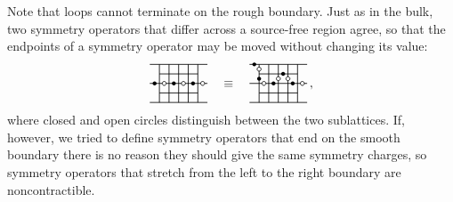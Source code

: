 %
%
Note that loops cannot terminate on the rough boundary. Just as in the bulk, two symmetry operators that differ across a source-free region agree, so that the endpoints of a symmetry operator may be moved without changing its value:
%
%
\begin{equation*}
    \begin{tikzpicture}[baseline={(0,-0.1)}, scale=0.75]%
        \foreach \y in {-2, 0, 2} {
            \draw [semithick] (-7.2ex, {\y*2.4 ex}) to (7.2ex, {\y*2.4 ex});
        }
        \foreach \y in {-1, 1} {
            \draw [semithick] (-4.8ex, {\y*2.4 ex}) to (4.8ex, {\y*2.4 ex});
        }
        \foreach \x in {-2, -1, ..., 2} {
            \draw [semithick] ({\x*2.4 ex}, {-2*2.4 ex}) to ({\x*2.4 ex}, {2*2.4 ex});
        }
        \fill (-6ex, 0) circle(0.5ex);\fill (-1.2ex, 0) circle(0.5ex);\fill (3.6ex, 0) circle(0.5ex);
        \draw [semithick, fill=white] (-3.6ex, 0) circle(0.5ex);\draw [semithick, fill=white] (1.2ex, 0) circle(0.5ex);\draw [semithick, fill=white] (6ex, 0) circle(0.5ex);
    \end{tikzpicture}
    \quad \equiv \quad
    \begin{tikzpicture}[baseline={(0,-0.1)}, scale=0.75]%
        \foreach \y in {-2, 0, 2} {
            \draw [semithick] (-7.2ex, {\y*2.4 ex}) to (7.2ex, {\y*2.4 ex});
        }
        \foreach \y in {-1, 1} {
            \draw [semithick] (-4.8ex, {\y*2.4 ex}) to (4.8ex, {\y*2.4 ex});
        }
        \foreach \x in {-2, -1, ..., 2} {
            \draw [semithick] ({\x*2.4 ex}, {-2*2.4 ex}) to ({\x*2.4 ex}, {2*2.4 ex});
        }
        \fill (-6ex, 4.8ex) circle(0.5ex);\fill (-4.8ex, 1.2ex) circle(0.5ex);
        \fill (-1.2ex, 0) circle(0.5ex);\fill (3.6ex, 0) circle(0.5ex);
        \fill (1.2ex, 2.4ex) circle(0.5ex);
        \draw [semithick, fill=white] (-4.8ex, 3.6ex) circle(0.5ex);\draw [semithick, fill=white] (-3.6ex, 0) circle(0.5ex);
        \draw [semithick, fill=white] (0, 1.2ex) circle(0.5ex);\draw [semithick, fill=white] (2.4ex, 1.2ex) circle(0.5ex);
        \draw [semithick, fill=white] (6ex, 0) circle(0.5ex);
    \end{tikzpicture} 
    \, ,
\end{equation*}
%
%
where closed and open circles distinguish between the two sublattices.
If, however, we tried to define symmetry operators that end on the smooth boundary there is no reason they should give the same symmetry charges, so symmetry operators that stretch from the left to the right boundary are noncontractible.

